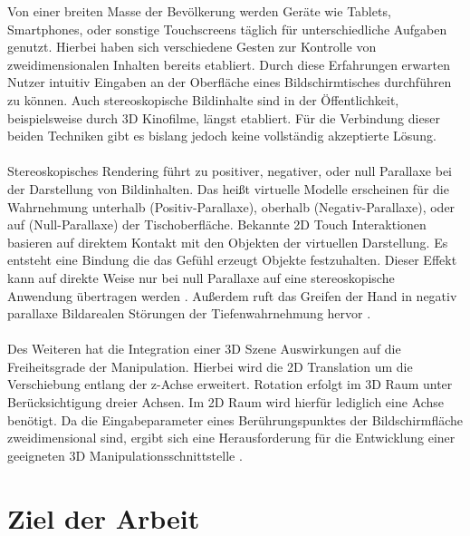 Von einer breiten Masse der Bevölkerung werden Geräte wie Tablets, Smartphones, oder sonstige Touchscreens täglich für unterschiedliche Aufgaben genutzt. Hierbei haben sich verschiedene Gesten zur Kontrolle von zweidimensionalen Inhalten bereits etabliert. Durch diese Erfahrungen erwarten Nutzer intuitiv Eingaben an der Oberfläche eines Bildschirmtisches durchführen zu können.  Auch stereoskopische Bildinhalte sind in der Öffentlichkeit, beispielsweise durch 3D Kinofilme, längst etabliert. Für die Verbindung dieser beiden Techniken gibt es bislang jedoch keine vollständig akzeptierte Lösung.
\\\\ 
Stereoskopisches Rendering führt zu positiver, negativer, oder null Parallaxe bei der Darstellung von Bildinhalten. Das heißt virtuelle Modelle erscheinen für die Wahrnehmung unterhalb (Positiv-Parallaxe), oberhalb (Negativ-Parallaxe), oder auf (Null-Parallaxe) der Tischoberfläche. Bekannte 2D Touch Interaktionen basieren auf direktem Kontakt mit den Objekten der virtuellen Darstellung. Es entsteht eine Bindung die das Gefühl erzeugt Objekte festzuhalten. Dieser Effekt kann auf direkte Weise nur bei null Parallaxe auf eine stereoskopische Anwendung übertragen werden \cite{bruder:2013}. Außerdem ruft das Greifen der Hand in negativ parallaxe Bildarealen Störungen der Tiefenwahrnehmung hervor \cite{delariviere:2010}.
\\\\
Des Weiteren hat die Integration einer 3D Szene Auswirkungen auf die Freiheitsgrade der Manipulation. Hierbei wird die 2D Translation um die Verschiebung entlang der z-Achse erweitert. Rotation erfolgt im 3D Raum unter Berücksichtigung dreier Achsen. Im 2D Raum wird hierfür lediglich eine Achse benötigt. Da die Eingabeparameter eines Berührungspunktes der Bildschirmfläche zweidimensional sind, ergibt sich eine Herausforderung für die Entwicklung einer geeigneten 3D Manipulationsschnittstelle \cite{martinet:2012}.


\section{Ziel der Arbeit}
\label{sec:ziel_der_arbeit}

